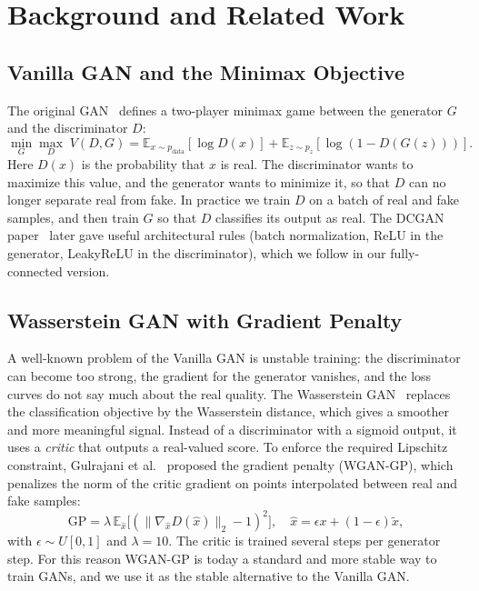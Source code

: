 \documentclass[10pt,twocolumn]{article}
\begin{document}
\section{Background and Related Work}

\subsection{Vanilla GAN and the Minimax Objective}

The original GAN~\cite{goodfellow2014} defines a two-player minimax game between the generator
$G$ and the discriminator $D$:
\begin{equation}
\min_{G}\max_{D}\; V(D,G) =
\mathbb{E}_{x\sim p_{\text{data}}}[\log D(x)] +
\mathbb{E}_{z\sim p_z}[\log(1 - D(G(z)))].
\label{eq:gan}
\end{equation}
Here $D(x)$ is the probability that $x$ is real. The discriminator wants to maximize this
value, and the generator wants to minimize it, so that $D$ can no longer separate real from
fake. In practice we train $D$ on a batch of real and fake samples, and then train $G$ so that
$D$ classifies its output as real. The DCGAN paper~\cite{radford2015} later gave useful
architectural rules (batch normalization, ReLU in the generator, LeakyReLU in the
discriminator), which we follow in our fully-connected version.

\subsection{Wasserstein GAN with Gradient Penalty}

A well-known problem of the Vanilla GAN is unstable training: the discriminator can become too
strong, the gradient for the generator vanishes, and the loss curves do not say much about the
real quality. The Wasserstein GAN~\cite{arjovsky2017} replaces the classification objective by
the Wasserstein distance, which gives a smoother and more meaningful signal. Instead of a
discriminator with a sigmoid output, it uses a \emph{critic} that outputs a real-valued score.
To enforce the required Lipschitz constraint, Gulrajani et al.~\cite{gulrajani2017} proposed
the gradient penalty (WGAN-GP), which penalizes the norm of the critic gradient on points
interpolated between real and fake samples:
\begin{equation}
\text{GP} = \lambda\,
\mathbb{E}_{\hat{x}}\big[(\lVert \nabla_{\hat{x}} D(\hat{x}) \rVert_2 - 1)^2\big],
\quad \hat{x} = \epsilon x + (1-\epsilon)\tilde{x},
\label{eq:gp}
\end{equation}
with $\epsilon\sim U[0,1]$ and $\lambda=10$. The critic is trained several steps per generator
step. For this reason WGAN-GP is today a standard and more stable way to train GANs, and we use
it as the stable alternative to the Vanilla GAN.
\end{document}
